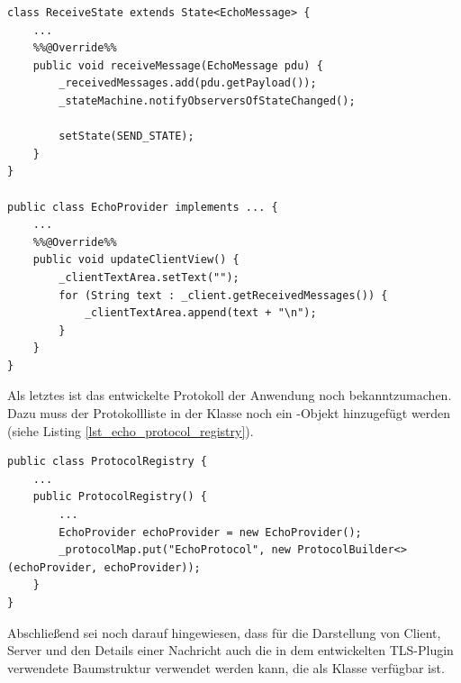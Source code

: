 \begin{lstlisting}[style=java, caption=Aktualisierungsmechanismus bei Zustandsänderung, label=lst_echo_state_changed]
class ReceiveState extends State<EchoMessage> {
	...
	%%@Override%%
	public void receiveMessage(EchoMessage pdu) {
		_receivedMessages.add(pdu.getPayload());
		_stateMachine.notifyObserversOfStateChanged();

		setState(SEND_STATE);
	}
}

public class EchoProvider implements ... {
	...
	%%@Override%%
	public void updateClientView() {
		_clientTextArea.setText("");
		for (String text : _client.getReceivedMessages()) {
			_clientTextArea.append(text + "\n");
		}
	}
}
\end{lstlisting}

Als letztes ist das entwickelte Protokoll der Anwendung noch bekanntzumachen. Dazu muss der Protokollliste in der Klasse  noch ein -Objekt hinzugefügt werden (siehe Listing \ref{lst_echo_protocol_registry}).

\begin{lstlisting}[style=java, caption=Protokollregistrierung, label=lst_echo_protocol_registry]
public class ProtocolRegistry {
	...
	public ProtocolRegistry() {
		...
		EchoProvider echoProvider = new EchoProvider();
		_protocolMap.put("EchoProtocol", new ProtocolBuilder<>(echoProvider, echoProvider));
	}	
}
\end{lstlisting}

Abschließend sei noch darauf hingewiesen, dass für die Darstellung von Client, Server und den Details einer Nachricht auch die in dem entwickelten TLS-Plugin verwendete Baumstruktur verwendet werden kann, die als Klasse  verfügbar ist.